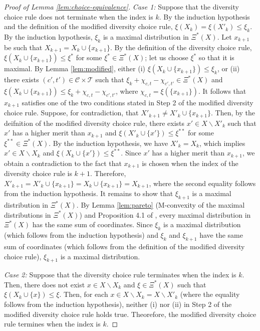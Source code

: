 \documentclass[12pt]{amsart}
\theoremstyle{remark}
\begin{document}
\begin{proof}[Proof of Lemma \ref{lem:choice-equivalence}]
\smallskip
\emph{Case 1:} Suppose that the diversity choice rule does not terminate when the index is $k$.
By the induction hypothesis and the definition of the modified diversity choice rule,
$\xi(X_k)=\xi(X'_k)\leq \xi_k$. By the induction hypothesis, $\xi_k$ is a maximal distribution in $\Xi^*(X)$. Let $x_{k+1}$ be such that $X_{k+1}=X_k\cup\{x_{k+1}\}$. By the definition of the diversity choice rule, $\xi(X_k\cup\{x_{k+1}\})\leq \xi^*$ for some $\xi^*\in \Xi^*(X)$; let us choose $\xi^*$ so that it is maximal. By Lemma \ref{lem:modified}, either (i) $\xi(X_k \cup \{x_{k+1}\})\leq \xi_k$, or (ii) there exists $(c',t')\in \mathcal{C}\times \mathcal{T}$ such that $\xi_k+\chi_{c,t}-\chi_{c',t'}\in \Xi^*(X)$ and $\xi(X_k\cup \{x_{k+1}\})\leq \xi_k+\chi_{c,t}-\chi_{c',t'}$, where $\chi_{c,t}=\xi(\{x_{k+1}\})$. It follows that $x_{k+1}$ satisfies one of the two conditions stated in Step 2 of the modified diversity choice rule. Suppose, for contradiction, that $X'_{k+1}\neq X'_k\cup \{x_{k+1}\}$. Then, by the deifnition of the modified diversity choice rule, there exists $x'\in X\backslash X'_k$ such that $x'$ has a higher merit than $x_{k+1}$ and $\xi(X'_k\cup\{x'\})\leq \xi^{**}$ for some $\xi^{**}\in \Xi^*(X)$. By the induction hypothesis, we have $X'_k=X_k$, which implies $x'\in X\backslash X_k$ and $\xi(X_k\cup\{x'\})\leq \xi^{**}$. Since $x'$ has a higher merit than $x_{k+1}$, we obtain a contradiction to the fact that $x_{k+1}$ is chosen when the index of the diversity choice rule is $k+1$. Therefore, $X'_{k+1}=X'_k\cup \{x_{k+1}\}=X_k\cup\{x_{k+1}\}=X_{k+1}$, where the second equality follows from the induction hypothesis. It remains to show that $\xi_{k+1}$ is a maximal distribution in $\Xi^*(X)$. By Lemma \ref{lem:pareto} (M-convexity of the maximal distributions in $\Xi^*(X)$) and Proposition 4.1 of \cite{Murota:SIAM:2003}, every maximal distribution in $\Xi^*(X)$ has the same sum of coordinates. Since $\xi_k$ is a maximal distribution (which follows from the induction hypothesis) and $\xi_k$ and $\xi_{k+1}$ have the same sum of coordinates (which follows from the definition of the modified diversity choice rule), $\xi_{k+1}$ is a maximal distribution.

\smallskip
\emph{Case 2:} Suppose that the diversity choice rule terminates when the index is $k$. Then, there does not exist $x\in X\backslash X_k$ and $\xi\in \Xi^*(X)$ such that $\xi(X_k\cup\{x\})\leq \xi$. Then, for each $x\in X\backslash X_k=X\backslash X'_k$ (where the equality follows from the induction hypothesis), neither (i) nor (ii) in Step 2 of the modified diversity choice rule holds true. Theorefore, the modified diversity choice rule termines when the index is $k$.





\end{proof}
\end{document}
